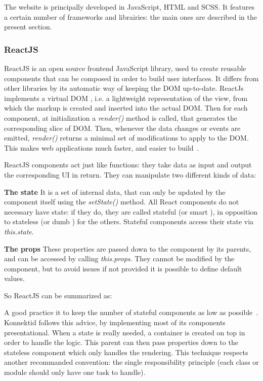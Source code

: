 The website is principally developed in JavaScript, HTML and SCSS. It features a certain number of frameworks and librairies: the main ones are described in the present section.

\subsubsection{ReactJS}
\label{sssec:react}

ReactJS is an open source frontend JavaScript library, used to create reusable components that can be composed in order to build user interfaces. It differs from other libraries by its automatic way of keeping the DOM up-to-date. ReactJs implements a \guillemotleft{} virtual DOM \guillemotright{}, i.e. a lightweight representation of the view, from which the markup is created and inserted into the actual DOM. Then for each component, at initialization a \textit{render()} method is called, that generates the corresponding slice of DOM. Then, whenever the data changes or events are emitted, \textit{render()} returns a minimal set of modifications to apply to the DOM.
This makes web applications much faster, and easier to build~\cite{whyReact}.

ReactJS components act just like functions: they take data as input and output the corresponding UI in return. They can manipulate two different kinds of data:

\textbf{The state} It is a set of internal data, that can only be updated by the component itself using the \textit{setState()}  method. All React components do not necessary have state: if they do, they are called \guillemotleft{} stateful \guillemotright{} (or \guillemotleft{} smart \guillemotright{}), in opposition to \guillemotleft{} stateless \guillemotright{} (or \guillemotleft{} dumb \guillemotright{}) for the others. Stateful components access their state via \textit{this.state}.

\textbf{The props} These properties are passed down to the component by its parents, and can be accessed by calling \textit{this.props}. They cannot be modified by the component, but to avoid issues if not provided it is possible to define default values.

So ReactJS can be summarized as: 

A good practice it to keep the number of stateful components as low as possible~\cite{state}. Konnektid follows this advice, 
by implementing most of its components presentational. When a state is really needed, a \guillemotleft{} container \guillemotright{} is created on top in order to handle the logic. This parent can then pass properties down to the stateless component which only handles the rendering. This technique respects another recommanded convention: the single responsibility principle (each class or module should only have one task to handle). 

